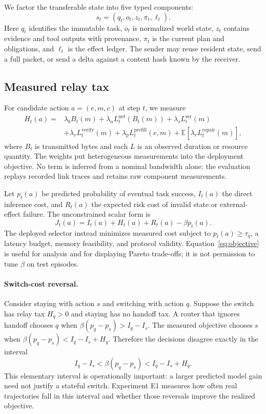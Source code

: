 \documentclass[10pt]{article}
\begin{document}
We factor the transferable state into five typed components:
\[
s_t=(q_t,o_t,z_t,\pi_t,\ell_t).
\]
Here $q_t$ identifies the immutable task, $o_t$ is normalized world state,
$z_t$ contains evidence and tool outputs with provenance, $\pi_t$ is the
current plan and obligations, and $\ell_t$ is the effect ledger. The sender
may reuse resident state, send a full packet, or send a delta against a
content hash known by the receiver.

\subsection{Measured relay tax}

For candidate action $a=(e,m,c)$ at step $t$, we measure
\begin{align}
H_t(a) ={}&
 \lambda_b B_t(m)
 +\lambda_n L_t^{\mathrm{net}}(B_t(m))
 +\lambda_s L_t^{\mathrm{ser}}(m) \nonumber\\
&+\lambda_v L_t^{\mathrm{verify}}(m)
 +\lambda_p L_t^{\mathrm{prefill}}(e,m)
 +\mathbb{E}\!\left[\lambda_r L_t^{\mathrm{repair}}(m)\right],
\label{eq:relay-tax}
\end{align}
where $B_t$ is transmitted bytes and each $L$ is an observed duration or
resource quantity. The weights put heterogeneous measurements into the
deployment objective. No term is inferred from a nominal bandwidth alone:
the evaluation replays recorded link traces and retains raw component
measurements.

Let $p_t(a)$ be predicted probability of eventual task success, $I_t(a)$ the
direct inference cost, and $R_t(a)$ the expected risk cost of invalid state or
external-effect failure. The unconstrained scalar form is
\begin{equation}
J_t(a)=I_t(a)+H_t(a)+R_t(a)-\beta p_t(a).
\label{eq:objective}
\end{equation}
The deployed selector instead minimizes measured cost subject to
$p_t(a)\geq\tau_q$, a latency budget, memory feasibility, and protocol
validity. Equation~\ref{eq:objective} is useful for analysis and for
displaying Pareto trade-offs; it is not permission to tune $\beta$ on test
episodes.

\paragraph{Switch-cost reversal.}
Consider staying with action $s$ and switching with action $q$. Suppose the
switch has relay tax $H_q>0$ and staying has no handoff tax. A router that
ignores handoff chooses $q$ when
$\beta(p_q-p_s)>I_q-I_s$. The measured objective chooses $s$ when
$\beta(p_q-p_s)<I_q-I_s+H_q$. Therefore the decisions disagree exactly in
the interval
\begin{equation}
 I_q-I_s < \beta(p_q-p_s) < I_q-I_s+H_q.
\label{eq:reversal}
\end{equation}
This elementary interval is operationally important: a larger predicted
model gain need not justify a stateful switch. Experiment E1 measures how
often real trajectories fall in this interval and whether those reversals
improve the realized objective.
\end{document}
